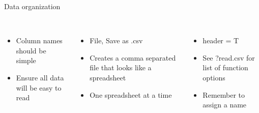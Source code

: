 \documentclass[xcolor=svgnames]{beamer}
\begin{document}
\begin{frame}[fragile]{Data organization}
\\~\\
\begin{center}
\end{center}
\begin{columns}[t]
\begin{column}{0.33\textwidth}
\begin{itemize}
\item Column names should be simple
\item Ensure all data will be easy to read
\end{itemize}
\end{column}
\begin{column}{0.33\textwidth}
\begin{itemize}
\item File, Save as .csv
\item Creates a comma separated file that looks like a spreadsheet
\item One spreadsheet at a time
\end{itemize}
\end{column}
\begin{column}{0.33\textwidth}
\begin{itemize}
\item header = T
\item See ?read.csv for list of function options
\item Remember to assign a name
\end{itemize}
\end{column}
\end{columns}
\end{frame}
\end{document}
